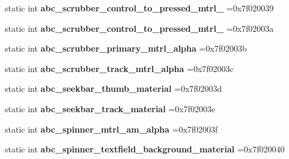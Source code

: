 \begin{DoxyCompactItemize}
static int {\bfseries abc\+\_\+scrubber\+\_\+control\+\_\+to\+\_\+pressed\+\_\+mtrl\+\_} =0x7f020039
\item 
\mbox{\label{classandroid_1_1support_1_1v7_1_1recyclerview_1_1R_1_1drawable_a2a1534c39699dea15e90c0eb16f3ebaa}} 
static int {\bfseries abc\+\_\+scrubber\+\_\+control\+\_\+to\+\_\+pressed\+\_\+mtrl\+\_} =0x7f02003a
\item 
\mbox{\label{classandroid_1_1support_1_1v7_1_1recyclerview_1_1R_1_1drawable_aa94e9deaf6620d53795e2a34fe629a18}} 
static int {\bfseries abc\+\_\+scrubber\+\_\+primary\+\_\+mtrl\+\_\+alpha} =0x7f02003b
\item 
\mbox{\label{classandroid_1_1support_1_1v7_1_1recyclerview_1_1R_1_1drawable_ab6aeb944c8f51d1c78bfa42b7c1f1e55}} 
static int {\bfseries abc\+\_\+scrubber\+\_\+track\+\_\+mtrl\+\_\+alpha} =0x7f02003c
\item 
\mbox{\label{classandroid_1_1support_1_1v7_1_1recyclerview_1_1R_1_1drawable_a0770624102cff7593af9d2eb10e686b0}} 
static int {\bfseries abc\+\_\+seekbar\+\_\+thumb\+\_\+material} =0x7f02003d
\item 
\mbox{\label{classandroid_1_1support_1_1v7_1_1recyclerview_1_1R_1_1drawable_a601269c2709656333648b334b5144a56}} 
static int {\bfseries abc\+\_\+seekbar\+\_\+track\+\_\+material} =0x7f02003e
\item 
\mbox{\label{classandroid_1_1support_1_1v7_1_1recyclerview_1_1R_1_1drawable_a5c4f9170c357c6b8fb76cada05e0f0cb}} 
static int {\bfseries abc\+\_\+spinner\+\_\+mtrl\+\_\+am\+\_\+alpha} =0x7f02003f
\item 
\mbox{\label{classandroid_1_1support_1_1v7_1_1recyclerview_1_1R_1_1drawable_ae7abae41e38ec56df5df7a7553c32905}} 
static int {\bfseries abc\+\_\+spinner\+\_\+textfield\+\_\+background\+\_\+material} =0x7f020040

\end{DoxyCompactItemize}
